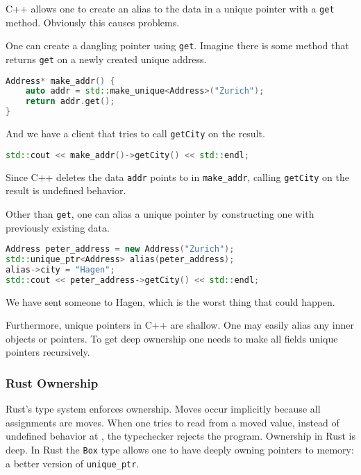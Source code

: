 \documentclass{article}
\begin{document}
C++ allows one to create an alias to the data in a unique pointer with a \texttt{get} method.
Obviously this causes problems.

\begin{example}
  One can create a dangling pointer using \texttt{get}.
  Imagine there is some method that returns \texttt{get} on a newly created unique address.
\begin{lstlisting}[language=C++]
Address* make_addr() {
    auto addr = std::make_unique<Address>("Zurich");
    return addr.get();
}
\end{lstlisting}
  And we have a client that tries to call \texttt{getCity} on the result.
\begin{lstlisting}[language=C++]
std::cout << make_addr()->getCity() << std::endl;
\end{lstlisting}
  Since C++ deletes the data \texttt{addr} points to in \texttt{make\_addr}, calling \texttt{getCity} on the result is undefined behavior.
\end{example}

\begin{example}
  Other than \texttt{get}, one can alias a unique pointer by constructing one with previously existing data.
\begin{lstlisting}[language=C++]
Address peter_address = new Address("Zurich");
std::unique_ptr<Address> alias(peter_address);
alias->city = "Hagen";
std::cout << peter_address->getCity() << std::endl;
\end{lstlisting}
  We have sent someone to Hagen, which is the worst thing that could happen.
\end{example}

Furthermore, unique pointers in C++ are shallow.
One may easily alias any inner objects or pointers.
To get deep ownership one needs to make all fields unique pointers recursively.

\subsubsection{Rust Ownership}

Rust's type system enforces ownership.
Moves occur implicitly because all assignments are moves.
When one tries to read from a moved value, instead of undefined behavior at \runtime{}, the typechecker rejects the program.
Ownership in Rust is deep.
In Rust the \texttt{Box} type allows one to have deeply owning pointers to memory: a better version of \texttt{unique\_ptr}.
\end{document}

